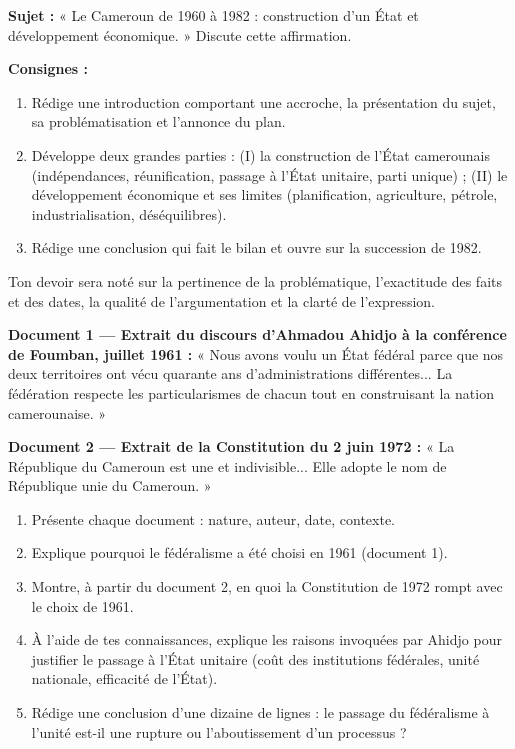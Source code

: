 \documentclass[11pt]{article}
\newcounter{popsec}
\newcounter{popsub}
\newcommand{\courssub}[1]{%
  \stepcounter{popsub}%
  \par\vspace{9pt}\noindent{\popxbold\fontsize{11.5}{13}\selectfont\color{popink}{\color{poporange}\thepopsec.\thepopsub}\hspace{6pt}#1}\par\nopagebreak\vspace{4pt}
}
\begin{document}
\courssub{Je me prépare au Bac}

\begin{exercice}
\textbf{Sujet :} « Le Cameroun de 1960 à 1982 : construction d'un État et développement économique. » Discute cette affirmation.

\textbf{Consignes :}
\begin{enumerate}
\item Rédige une introduction comportant une accroche, la présentation du sujet, sa problématisation et l'annonce du plan.
\item Développe deux grandes parties : (I) la construction de l'État camerounais (indépendances, réunification, passage à l'État unitaire, parti unique) ; (II) le développement économique et ses limites (planification, agriculture, pétrole, industrialisation, déséquilibres).
\item Rédige une conclusion qui fait le bilan et ouvre sur la succession de 1982.
\end{enumerate}
Ton devoir sera noté sur la pertinence de la problématique, l'exactitude des faits et des dates, la qualité de l'argumentation et la clarté de l'expression.
\end{exercice}

\begin{exercice}
\textbf{Document 1 — Extrait du discours d'Ahmadou Ahidjo à la conférence de Foumban, juillet 1961 :} « Nous avons voulu un État fédéral parce que nos deux territoires ont vécu quarante ans d'administrations différentes... La fédération respecte les particularismes de chacun tout en construisant la nation camerounaise. »

\textbf{Document 2 — Extrait de la Constitution du 2 juin 1972 :} « La République du Cameroun est une et indivisible... Elle adopte le nom de République unie du Cameroun. »

\begin{enumerate}
\item Présente chaque document : nature, auteur, date, contexte.
\item Explique pourquoi le fédéralisme a été choisi en 1961 (document 1).
\item Montre, à partir du document 2, en quoi la Constitution de 1972 rompt avec le choix de 1961.
\item À l'aide de tes connaissances, explique les raisons invoquées par Ahidjo pour justifier le passage à l'État unitaire (coût des institutions fédérales, unité nationale, efficacité de l'État).
\item Rédige une conclusion d'une dizaine de lignes : le passage du fédéralisme à l'unité est-il une rupture ou l'aboutissement d'un processus ?
\end{enumerate}
\end{exercice}
\end{document}
